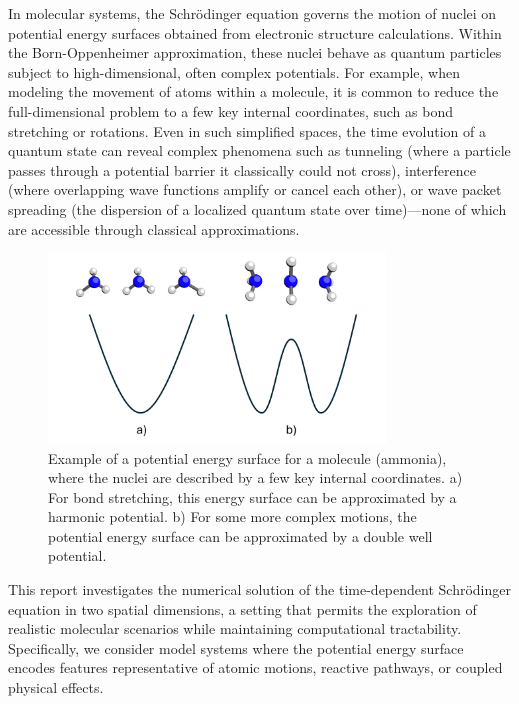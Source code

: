 \documentclass{article}
\theoremstyle{definition}
\theoremstyle{plain}
\theoremstyle{remark}
\begin{document}
In molecular systems, the Schrödinger equation governs the motion of nuclei on potential energy surfaces obtained from electronic structure calculations. Within the Born-Oppenheimer approximation, these nuclei behave as quantum particles subject to high-dimensional, often complex potentials. For example, when modeling the movement of atoms within a molecule, it is common to reduce the full-dimensional problem to a few key internal coordinates, such as bond stretching or rotations. Even in such simplified spaces, the time evolution of a quantum state can reveal complex phenomena such as tunneling (where a particle passes through a potential barrier it classically could not cross), interference (where overlapping wave functions amplify or cancel each other), or wave packet spreading (the dispersion of a localized quantum state over time)—none of which are accessible through classical approximations.

\begin{figure}[h]
    \centering
    \includegraphics[width=0.8\textwidth]{figures/Figure2.pdf}
    \caption{Example of a potential energy surface for a molecule (ammonia), where the nuclei are described by a few key internal coordinates. a) For bond stretching, this energy surface can be approximated by a harmonic potential. b) For some more complex motions, the potential energy surface can be approximated by a double well potential.}
    \label{fig:potential_energy_surface}
\end{figure}

This report investigates the numerical solution of the time-dependent Schrödinger equation in two spatial dimensions, a setting that permits the exploration of realistic molecular scenarios while maintaining computational tractability. Specifically, we consider model systems where the potential energy surface encodes features representative of atomic motions, reactive pathways, or coupled physical effects.
\end{document}
